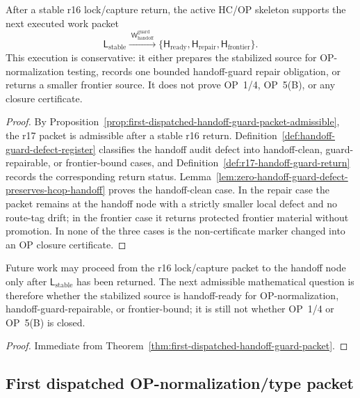 \begin{theorem}
\label{thm:first-dispatched-handoff-guard-packet}
After a stable r16 lock/capture return, the active HC/OP skeleton supports the next executed work packet
\[
  \mathsf L_{\mathrm{stable}}
  \xrightarrow{\;\mathsf W_{\mathrm{handoff}}^{\mathrm{guard}}\;}
  \{\mathsf H_{\mathrm{ready}},\mathsf H_{\mathrm{repair}},\mathsf H_{\mathrm{frontier}}\}.
\]
This execution is conservative: it either prepares the stabilized source for OP-normalization testing, records one bounded handoff-guard repair obligation, or returns a smaller frontier source.  It does not prove OP~1/4, OP~5(B), or any closure certificate.
\end{theorem}

\begin{proof}
By Proposition~\ref{prop:first-dispatched-handoff-guard-packet-admissible}, the r17 packet is admissible after a stable r16 return.  Definition~\ref{def:handoff-guard-defect-register} classifies the handoff audit defect into handoff-clean, guard-repairable, or frontier-bound cases, and Definition~\ref{def:r17-handoff-guard-return} records the corresponding return status.  Lemma~\ref{lem:zero-handoff-guard-defect-preserves-hcop-handoff} proves the handoff-clean case.  In the repair case the packet remains at the handoff node with a strictly smaller local defect and no route-tag drift; in the frontier case it returns protected frontier material without promotion.  In none of the three cases is the non-certificate marker changed into an OP closure certificate.
\end{proof}

\begin{corollary}
\label{cor:v3340-r17-working-rule}
Future work may proceed from the r16 lock/capture packet to the handoff node only after \(\mathsf L_{\mathrm{stable}}\) has been returned.  The next admissible mathematical question is therefore whether the stabilized source is handoff-ready for OP-normalization, handoff-guard-repairable, or frontier-bound; it is still not whether OP~1/4 or OP~5(B) is closed.
\end{corollary}

\begin{proof}
Immediate from Theorem~\ref{thm:first-dispatched-handoff-guard-packet}.
\end{proof}


\subsection{First dispatched OP-normalization/type packet}
\label{subsec:first-dispatched-op-normalization-type-packet}

